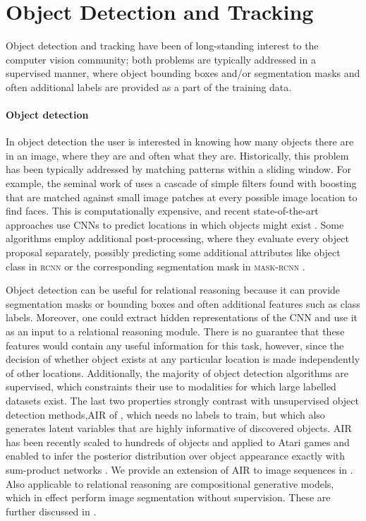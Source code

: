 \section{Object Detection and Tracking}
\label{sec:object_det_track}

	Object detection and tracking have been of long-standing interest to the computer vision community;
	both problems are typically addressed in a supervised manner, where object bounding boxes and/or segmentation masks and often additional labels are provided as a part of the training data.
	\paragraph{Object detection}
	In object detection the user is interested in knowing how many objects there are in an image, where they are and often what they are. 
	Historically, this problem has been typically addressed by matching patterns within a sliding window.
	For example, the seminal work of \cite{Viola2001face} uses a cascade of simple filters found with boosting \citep{Schapire1999boosting} that are matched against small image patches at every possible image location to find faces.
	This is computationally expensive, and recent state-of-the-art approaches use \gls{CNN}s to predict locations in which objects might exist \citep{Redmon15}.
	Some algorithms employ additional post-processing, where they evaluate every object proposal separately, possibly predicting some additional attributes like object class in \textsc{rcnn} \citep{Girshick2013rcnn,Ren2015fasterrcnn} or the corresponding segmentation mask in \textsc{mask-rcnn} \citep{He2017maskrcnn}.
	
	Object detection can be useful for relational reasoning because it can provide segmentation masks or bounding boxes and often additional features such as class labels.
	Moreover, one could extract hidden representations of the \gls{CNN} and use it as an input to a relational reasoning module.
	There is no guarantee that these features would contain any useful information for this task, however, since the decision of whether object exists at any particular location is made independently of other locations.
	Additionally, the majority of object detection algorithms are supervised, which constraints their use to modalities for which large labelled datasets exist.
	The last two properties strongly contrast with unsupervised object detection methods,\eg \gls{AIR} of \cite{Eslami2016air}, which needs no labels to train, but which also generates latent variables that are highly informative of discovered objects.
	\gls{AIR} has been recently scaled to hundreds of objects and applied to Atari games \citep{Crawford2019spair,Jiang2019scalor} and enabled to infer the posterior distribution over object appearance exactly with sum-product networks \citep{Stelzner2019supair}.
	We provide an extension of \gls{AIR} to image sequences in .
	Also applicable to relational reasoning are compositional generative models, which in effect perform image segmentation without supervision.
	These are further discussed in .
	
